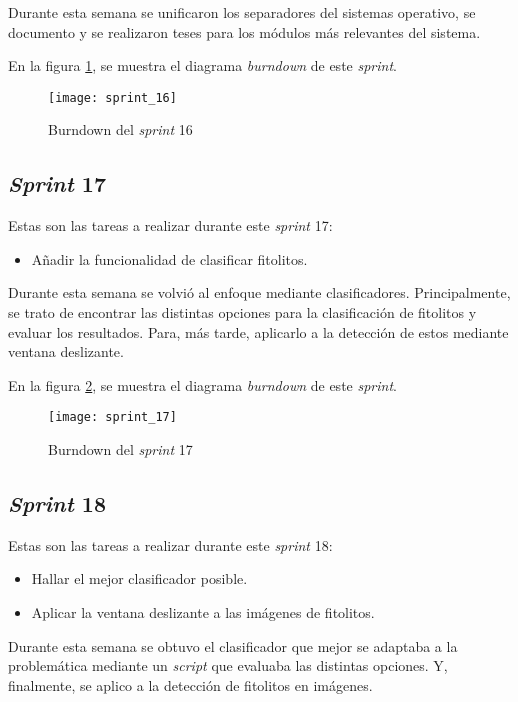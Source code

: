 Durante esta semana se unificaron los separadores del sistemas operativo, se documento y se realizaron teses para los módulos más relevantes del sistema.

En la figura \ref{fig:A.1.17}, se muestra el diagrama \textit{burndown} de este \textit{sprint}.

\begin{figure}
\centering
\texttt{[image: sprint\_16]}
\caption{Burndown del \textit{sprint} 16}
\label{fig:A.1.17}
\end{figure}

\subsection{\textit{Sprint} 17}

Estas son las tareas a realizar durante este \textit{sprint} 17:

\begin{itemize}
	\item Añadir la funcionalidad de clasificar fitolitos.
\end{itemize}

Durante esta semana se volvió al enfoque mediante clasificadores. Principalmente, se trato de encontrar las distintas opciones para la clasificación de fitolitos y evaluar los resultados. Para, más tarde, aplicarlo a la detección de estos mediante ventana deslizante.

En la figura \ref{fig:A.1.18}, se muestra el diagrama \textit{burndown} de este \textit{sprint}.

\begin{figure}
\centering
\texttt{[image: sprint\_17]}
\caption{Burndown del \textit{sprint} 17}
\label{fig:A.1.18}
\end{figure}

\subsection{\textit{Sprint} 18}

Estas son las tareas a realizar durante este \textit{sprint} 18:

\begin{itemize}
	\item Hallar el mejor clasificador posible.
	\item Aplicar la ventana deslizante a las imágenes de fitolitos.
\end{itemize}

Durante esta semana se obtuvo el clasificador que mejor se adaptaba a la problemática mediante un \textit{script} que evaluaba las distintas opciones. Y, finalmente, se aplico a la detección de fitolitos en imágenes.

